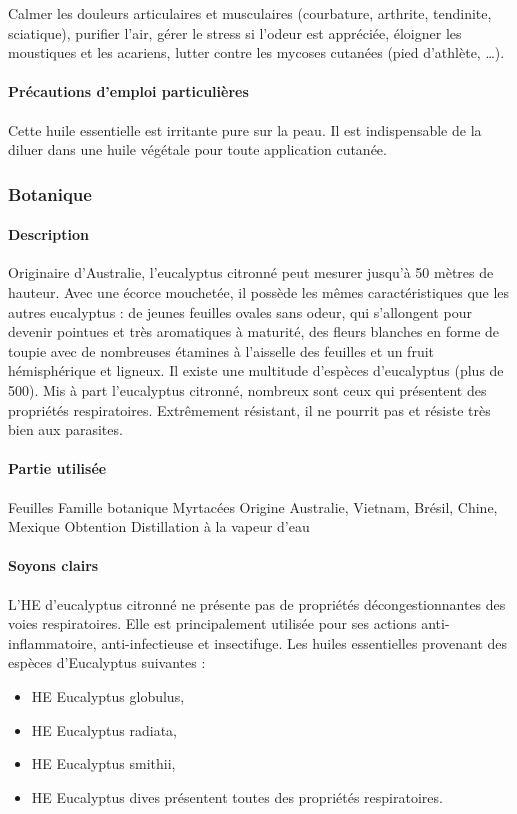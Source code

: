 \documentclass[12pt,a4wide]{article}
\begin{document}
Calmer les douleurs articulaires et musculaires (courbature, arthrite, tendinite, sciatique), purifier l'air, gérer le stress si l'odeur est appréciée, éloigner les moustiques et les acariens, lutter contre les mycoses cutanées (pied d'athlète, \ldots{}).

\paragraph{Précautions d'emploi particulières}
\label{sec-4-6-1-4}
Cette huile essentielle est irritante pure sur la peau. Il est indispensable de la diluer dans une huile végétale pour toute application cutanée.
\subsubsection{Botanique}
\label{sec-4-6-2}
\paragraph{Description}
\label{sec-4-6-2-1}

Originaire d'Australie, l'eucalyptus citronné peut  mesurer jusqu'à 50 mètres de
hauteur. Avec  une écorce mouchetée,  il possède les mêmes  caractéristiques que
les autres  eucalyptus : de jeunes  feuilles ovales sans odeur,  qui s'allongent
pour devenir  pointues et très  aromatiques à  maturité, des fleurs  blanches en
forme de  toupie avec  de nombreuses  étamines à l'aisselle  des feuilles  et un
fruit hémisphérique et ligneux.  Il  existe une multitude d'espèces d'eucalyptus
(plus  de  500). Mis  à  part  l'eucalyptus  citronné,  nombreux sont  ceux  qui
présentent des  propriétés respiratoires.  Extrêmement résistant, il  ne pourrit
pas et résiste très bien aux parasites.
\paragraph{Partie utilisée}
\label{sec-4-6-2-2}
Feuilles
Famille botanique
Myrtacées
Origine
Australie, Vietnam, Brésil, Chine, Mexique
Obtention
Distillation à la vapeur d'eau
\paragraph{Soyons clairs}
\label{sec-4-6-2-3}

L'HE d'eucalyptus citronné ne présente pas de propriétés décongestionnantes des voies respiratoires. Elle est principalement utilisée pour ses actions anti-inflammatoire, anti-infectieuse et insectifuge.
Les huiles essentielles provenant des espèces d'Eucalyptus suivantes :
\begin{itemize}
\item HE Eucalyptus globulus,
\item HE Eucalyptus radiata,
\item HE Eucalyptus smithii,
\item HE Eucalyptus dives présentent toutes des propriétés respiratoires.
\end{itemize}
\end{document}
